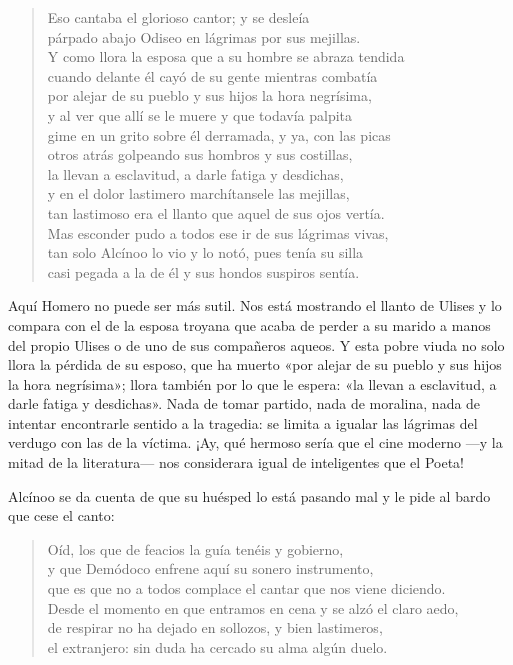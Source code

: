 \documentclass[11pt,a4paper]{article}
\begin{document}
\begin{verse}
Eso cantaba el glorioso cantor; y se desleía\\
párpado abajo Odiseo en lágrimas por sus mejillas.\\
Y como llora la esposa que a su hombre se abraza tendida\\
cuando delante él cayó de su gente mientras combatía\\
por alejar de su pueblo y sus hijos la hora negrísima,\\
y al ver que allí se le muere y que todavía palpita\\
gime en un grito sobre él derramada, y ya, con las picas\\
otros atrás golpeando sus hombros y sus costillas,\\
la llevan a esclavitud, a darle fatiga y desdichas,\\
y en el dolor lastimero marchítansele las mejillas,\\
tan lastimoso era el llanto que aquel de sus ojos vertía.\\
Mas esconder pudo a todos ese ir de sus lágrimas vivas,\\
tan solo Alcínoo lo vio y lo notó, pues tenía su silla\\
casi pegada a la de él y sus hondos suspiros sentía.
\end{verse}

Aquí Homero no puede ser más sutil. Nos está mostrando el llanto de Ulises y lo compara con el de la esposa troyana que acaba de perder a su marido a manos del propio Ulises o de uno de sus compañeros aqueos. Y esta pobre viuda no solo llora la pérdida de su esposo, que ha muerto «por alejar de su pueblo y sus hijos la hora negrísima»; llora también por lo que le espera: «la llevan a esclavitud, a darle fatiga y desdichas». Nada de tomar partido, nada de moralina, nada de intentar encontrarle sentido a la tragedia: se limita a igualar las lágrimas del verdugo con las de la víctima. ¡Ay, qué hermoso sería que el cine moderno ---y la mitad de la literatura--- nos considerara igual de inteligentes que el Poeta!


Alcínoo se da cuenta de que su huésped lo está pasando mal y le pide al bardo que cese el canto:

\begin{verse}
Oíd, los que de feacios la guía tenéis y gobierno,\\
y que Demódoco enfrene aquí su sonero instrumento,\\
que es que no a todos complace el cantar que nos viene diciendo.\\
Desde el momento en que entramos en cena y se alzó el claro aedo,\\
de respirar no ha dejado en sollozos, y bien lastimeros,\\
el extranjero: sin duda ha cercado su alma algún duelo.
\end{verse}
\end{document}
